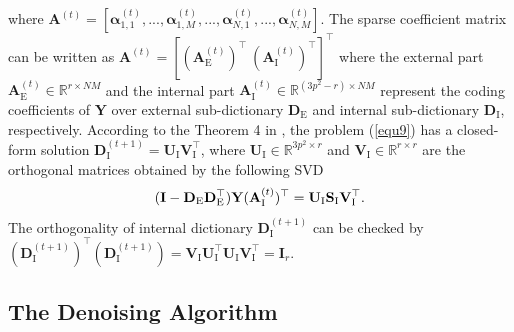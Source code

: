 \documentclass[10pt,twocolumn,letterpaper]{article}
\begin{document}
where $\textbf{A}^{(t)}=[\bm{\alpha}_{1,1}^{(t)},...,\bm{\alpha}_{1,M}^{(t)},...,\bm{\alpha}_{N,1}^{(t)},...,\bm{\alpha}_{N,M}^{(t)}]$. The sparse coefficient matrix can be written as $\mathbf{A}^{(t)}=[(\mathbf{A}_{\text{E}}^{(t)})^{\top}\ (\mathbf{A}_{\text{I}}^{(t)})^{\top}]^{\top}$ where the external part $\mathbf{A}_{\text{E}}^{(t)}\in\mathbb{R}^{r\times NM}$ and the internal part $\mathbf{A}_{\text{I}}^{(t)}\in\mathbb{R}^{(3p^2-r)\times NM}$ represent the coding coefficients of $\mathbf{Y}$ over external sub-dictionary $\mathbf{D}_{\text{E}}$ and internal sub-dictionary $\mathbf{D}_{\text{I}}$, respectively. According to the Theorem 4 in \cite{spca}, the problem (\ref{equ9}) has a closed-form solution $\mathbf{D}_{\text{I}}^{(t+1)}=\mathbf{U}_{\text{I}}\mathbf{V}_{\text{I}}^{\top}$, where $\mathbf{U}_{\text{I}}\in\mathbb{R}^{3p^2\times r}$ and $\mathbf{V}_{\text{I}}\in\mathbb{R}^{r\times r}$ are the orthogonal matrices obtained by the following SVD
\vspace{-1mm}
\begin{equation}\label{equ10}\vspace{-2mm}
(\mathbf{I}-\mathbf{D}_{\text{E}}\mathbf{D}_{\text{E}}^{\top})\mathbf{Y}(\mathbf{A}_{\text{I}}^{(t)})^{\top}
=
\mathbf{U}_{\text{I}}\mathbf{S}_{\text{I}}\mathbf{V}_{\text{I}}^{\top}.
\end{equation}
The orthogonality of internal dictionary $\mathbf{D}_{\text{I}}^{(t+1)}$ can be checked by 
$(\mathbf{D}_{\text{I}}^{(t+1)})^{\top}(\mathbf{D}_{\text{I}}^{(t+1)})=\mathbf{V}_{\text{I}}\mathbf{U}_{\text{I}}^{\top}\mathbf{U}_{\text{I}}\mathbf{V}_{\text{I}}^{\top}=\mathbf{I}_{r}$. 


\subsection{The Denoising Algorithm}
\end{document}
